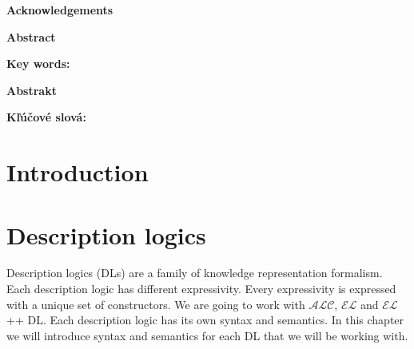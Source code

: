 \documentclass[12pt,a4paper]{article}
\newcommand{\textoverline}[1]{{\setul{-5em}{}$\overline{\mbox{#1}}$}}
\begin{document}
\pagebreak

\justify


\pagebreak
\thispagestyle{empty}
\par\vspace*{15cm}
{\large\bf Acknowledgements \newline \par}

\pagebreak
\thispagestyle{empty}
{\large\bf Abstract \newline \par} 

\textbf{Key words:}

\pagebreak
\thispagestyle{empty}
{\large\bf Abstrakt \newline \par} 

\textbf{Kľúčové slová:}

\pagebreak
\thispagestyle{empty}
\tableofcontents
\thispagestyle{empty}

\pagebreak
\thispagestyle{empty}
\listoffigures

\pagebreak
\section*{Introduction}


\pagebreak
\section{Description logics}
Description logics (DLs) are a family of knowledge representation formalism. Each description logic has different expressivity. Every expressivity is expressed with a unique set of constructors. We are going to work with $\mathcal{ALC}$, $\mathcal{EL}$ and $\mathcal{EL}${+}{+} DL. Each description logic has its own syntax and semantics. In this chapter we will introduce syntax and semantics \citep{Rudolph2011} for each DL that we will be working with.
\end{document}
